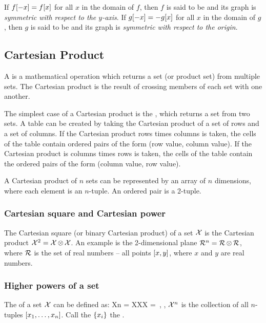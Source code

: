 \begin{remark}
If $f\!\left[{-x}\right] = f\!\left[{x}\right]$ for all $x$ in the domain of $f$, then $f$ is said to be  and its graph is \emph{symmetric with respect to the $y$-axis}. If $g\!\left[{-x}\right] = -g\!\left[{x}\right]$ for all $x$ in the domain of $g$, then $g$ is said to be  and its graph is \emph{symmetric with respect to the origin}.
\end{remark}


\subsection{Cartesian Product}
A  is a mathematical operation which returns a set (or product set) from multiple sets. The Cartesian product is the result of crossing members of each set with one another.

The simplest case of a Cartesian product is the , which returns a set from two sets. A table can be created by taking the Cartesian product of a set of rows and a set of columns. If the Cartesian product rows times columns is taken, the cells of the table contain ordered pairs of the form (row value, column value). If the Cartesian product is columns times rows is taken, the cells of the table contain the ordered pairs of the form (column value, row value).

A Cartesian product of $n$ sets can be represented by an array of $n$ dimensions, where each element is an $n$-tuple. An ordered pair is a 2-tuple.


\subsubsection{Cartesian square and Cartesian power}
The Cartesian square (or binary Cartesian product) of a set $\mathcal{X}$ is the Cartesian product $\mathcal{X}^{2} = \mathcal{X}\operatorname{\otimes}\mathcal{X}$. An example is the 2-dimensional plane $\mathcal{R}^{n} = \mathcal{R}\operatorname{\otimes}\mathcal{R}$, where $\mathcal{R}$ is the set of real numbers -- all points $\left[{x,y}\right]$, where $x$ and $y$ are real numbers.


\subsubsection{Higher powers of a set}
The  of a set $\mathcal{X}$ can be defined as:
\beq
\nset Xn = \set X\sprod\set X\dotsb\set X 
         = \,,
\eeq
\ie, $\mathcal{X}^{n}$ is the collection of all $n$-tuples $\left[{x_1,\dotsc,x_n}\right]$. Call the $\left\lbrace{x_i}\right\rbrace$ the .


